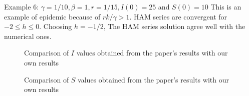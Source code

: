 \documentclass[10pt]{article}
\begin{document}
\newpage
Example 6: $\gamma=1 / 10, \beta=1, r=1 / 15, I(0)=25$ and $S(0)=10$
This is an example of epidemic because of $r k / \gamma>1$.  HAM series are convergent for $-2 \leqslant h \leqslant 0$. Choosing $h=-1 / 2$, The HAM series solution agree well with the numerical ones.
\begin{figure}[!htbp]
  \centering
  \hfill
  \caption{Comparison of \(I\) values obtained from the paper's results with our own results  }
\end{figure}
\begin{figure}[!htbp]
  \centering
  \hfill
  \caption{Comparison of \(S\) values obtained from the paper's results with our own results  }
\end{figure}
\end{document}
